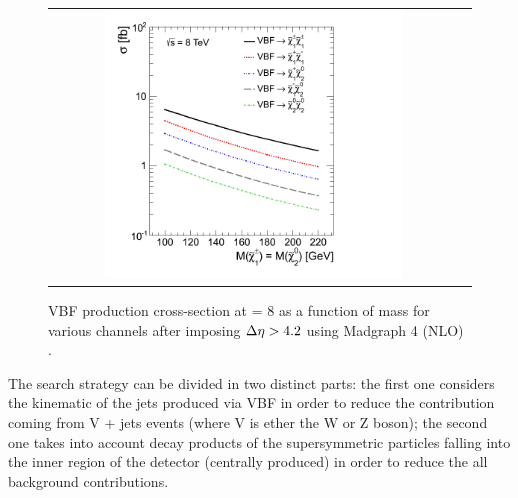 \begin{figure}[tbh!]
	\centering
	\begin{tabular}{cc}
		\includegraphics[width=0.75\textwidth]{analysis/pics/VBFXsection.png}
	\end{tabular}
	\caption{VBF production cross-section at \CM = 8 \tev as a function of mass for various channels after imposing \ensuremath{\deltaeta > 4.2} using Madgraph 4 (NLO) \cite{Dutta:2012xe}.}
	\label{fig:VBF_xsec}
\end{figure}

The search strategy can be divided in two distinct parts: the first one considers the kinematic of the jets produced via VBF in order to reduce the contribution coming  from V + jets events (where V is ether the W or Z boson); the second one takes into account decay products of the supersymmetric particles falling into the inner region of the detector (centrally produced) in order to reduce the all background contributions.

